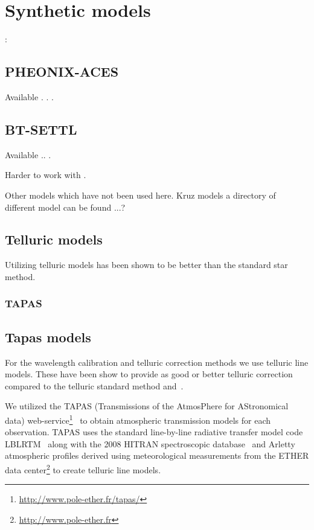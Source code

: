 \section{Synthetic models}:

\subsection{PHEONIX-ACES}

Available . . . 

\subsection{BT-SETTL}

Available .. . 

Harder to work with .

Other models which have not been used here. Kruz models a directory of different model can be found ...?


\subsection{Telluric models}

Utilizing telluric models has been shown to be better than the standard star method.
\subsubsection{TAPAS}

\subsection{Tapas models}
\label{subsec:tapas_models}
For the wavelength calibration and telluric correction methods we use telluric line models. These have been show to provide as good or better telluric correction compared to the telluric standard method and~\citep{ulmer-moll_telluric_2018}.

We utilized the TAPAS (Transmissions of the AtmosPhere for AStronomical data) web-service\footnote{\url{http://www.pole-ether.fr/tapas/}}~\citep{bertaux_tapas_2014} to obtain atmospheric transmission models for each observation. TAPAS uses the standard line-by-line radiative transfer model code LBLRTM~\citep{clough_linebyline_1995} along with the 2008 HITRAN spectroscopic database~\citep{rothman_hitran_2009} and Arletty atmospheric profiles derived using meteorological measurements from the ETHER data center\footnote{\url{http://www.pole-ether.fr}} to create telluric line models.

